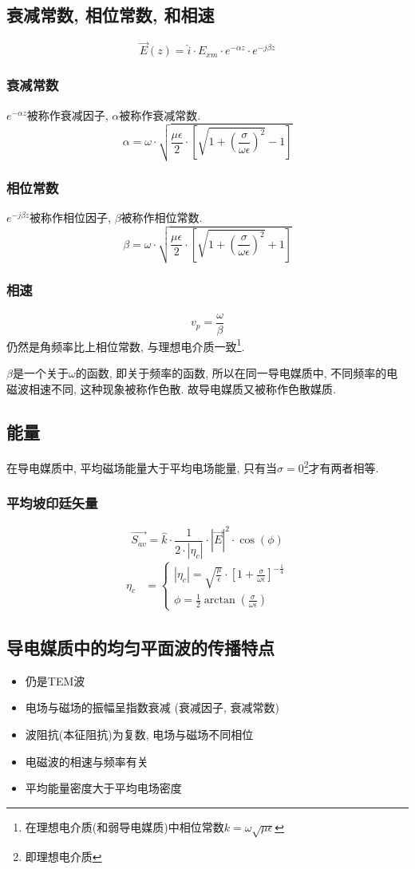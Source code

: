 \documentclass[a4paper]{report}
\begin{document}
\subsection{衰减常数, 相位常数, 和相速}
$$\vec{E}(z)=\hat{i}\cdot E_{xm}\cdot e^{-\alpha z}\cdot e^{-j\beta z} $$
\subsubsection{衰减常数}
$e^{-\alpha z}$被称作衰减因子, $\alpha$被称作衰减常数. 
$$\alpha=\omega\cdot \sqrt{\frac{\mu\epsilon}{2}\cdot[\sqrt{1+(\frac{\sigma}{\omega\epsilon})^2}-1]}$$
\subsubsection{相位常数}
$ e^{-j\beta z}$被称作相位因子, $\beta$被称作相位常数. 
$$\beta=\omega\cdot \sqrt{\frac{\mu\epsilon}{2}\cdot[\sqrt{1+(\frac{\sigma}{\omega\epsilon})^2}+1]}$$
\subsubsection{相速}
$$v_p=\frac{\omega}{\beta}$$
仍然是角频率比上相位常数, 与理想电介质一致\footnote{在理想电介质(和弱导电媒质)中相位常数$k=\omega\sqrt{\mu\epsilon}$}. 

$\beta$是一个关于$\omega$的函数, 即关于频率的函数, 所以在同一导电媒质中, 不同频率的电磁波相速不同, 这种现象被称作色散. 故导电媒质又被称作色散媒质. 
\subsection{能量}
在导电媒质中, 平均磁场能量大于平均电场能量, 只有当$\sigma=0$\footnote{即理想电介质}才有两者相等. 
\subsubsection{平均坡印廷矢量}
$$\vec{S_{av}}=\hat{k}\cdot \frac{1}{2\cdot |\eta_c|}\cdot |\vec{E} |^2\cdot \cos(\phi)$$
\begin{align*}
    \eta_c
    &=\begin{cases}
        |\eta_c|=\sqrt{\frac{\mu}{\epsilon}}\cdot [1+\frac{\sigma}{\omega\epsilon}]^{-\frac{1}{4}}\\
        \phi=\frac{1}{2}\arctan(\frac{\sigma}{\omega\epsilon})
    \end{cases}
\end{align*}
\subsection{导电媒质中的均匀平面波的传播特点}
\begin{itemize}
    \item 仍是TEM波
    \item 电场与磁场的振幅呈指数衰减 (衰减因子, 衰减常数)
    \item 波阻抗(本征阻抗)为复数, 电场与磁场不同相位
    \item 电磁波的相速与频率有关
    \item 平均能量密度大于平均电场密度
\end{itemize}
\end{document}
